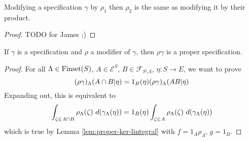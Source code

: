 \begin{lemma}
    \label{lem:modif-modif}
    \leanok

    Modifying a specification $\gamma$ by $\rho_1$ then $\rho_2$ is the same as modifying it by their product.
\end{lemma}
\begin{proof}

    TODO for James ;)
\end{proof}


\begin{lemma}
    \label{lem:modif-proper}
    \leanok

    If $\gamma$ is a specification and $\rho$ a modifier of $\gamma$, then $\rho\gamma$ is a proper specification.
\end{lemma}
\begin{proof}
    \leanok

    For all $\Lambda \in \operatorname{Finset}(S)$, $A \in \mathcal E^S$, $B \in \mathcal{F}_{S\setminus\Lambda}$, $\eta : S \to E$, we want to prove
    $$(\rho\gamma)_\Lambda(A \cap B | \eta) = 1_B(\eta) (\rho\gamma)_\Lambda(A B | \eta)$$
    Expanding out, this is equivalent to
    $$\int_{\zeta \in A \inter B} \rho_\Lambda(\zeta)\ d(\gamma_\Lambda(\eta)) = 1_B(\eta) \int_{\zeta \in A} \rho_\Lambda(\zeta)\ d(\gamma_\Lambda(\eta))$$
    which is true by Lemma \ref{lem:proper-ker-lintegral} with $f = 1_A\rho_\Lambda$, $g = 1_B$.
\end{proof}





